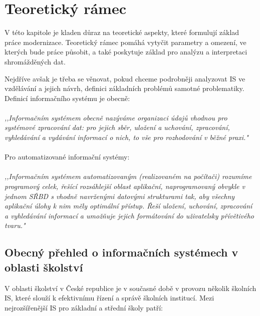 \documentclass[FM,Proj]{tulthesis}
\begin{document}
\chapter{Teoretický rámec}
V této kapitole je kladen důraz na teoretické aspekty, které formulují základ práce 
modernizace. Teoretický rámec pomáhá vytyčit parametry a omezení, ve kterých bude 
práce působit, a také poskytuje základ pro analýzu a interpretaci shromážděných dat. 

Nejdříve avšak je třeba se věnovat, pokud chceme podrobněji analyzovat IS ve vzdělávání 
a jejich návrh, definici základních problémů samotné problematiky. Definicí 
informačního systému je obecně:
\\\\
\textit{,,Informačním systémem obecně nazýváme organizaci údajů vhodnou pro systémové 
zpracování dat: pro jejich sběr, uložení a uchování, zpracování, vyhledávání a vydávání 
informací o nich, to vše pro rozhodování v běžné praxi."}\cite{Sarmanova2008ISaDS}
\\\\
Pro automatizované informační systémy:
\\\\
\textit{,,Informačním systémem automatizovaným (realizovaném na počítači) rozumíme programový 
celek, řešící rozsáhlejší oblast aplikační, naprogramovaný obvykle v jednom SŘBD s 
vhodně navrženými datovými strukturami tak, aby všechny aplikační úlohy k nim měly optimální 
přístup. Řeší uložení, uchování, zpracování a vyhledávání informací a umožňuje jejich 
formátování do uživatelsky přívětivého tvaru."}\cite{Sarmanova2008ISaDS}

\section{Obecný přehled o informačních systémech v oblasti školství}
V oblasti školství v České republice je v současné době v provozu několik školních 
IS, které slouží k efektivnímu řízení a správě školních institucí. 
Mezi nejrozšířenější IS pro základní a střední školy patří:
\end{document}
